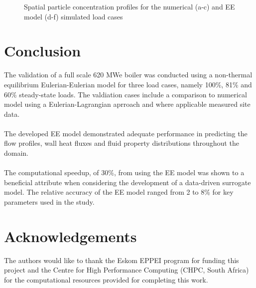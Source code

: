 \documentclass{webofc}
\begin{document}
\begin{figure}[h!]
\setlength{\belowcaptionskip}{0pt} 
\caption{Spatial particle concentration profiles for the numerical (a-c) and EE model (d-f) simulated load cases}
\label{fig_concentration}
\end{figure}

\section{Conclusion}
The validation of a full scale 620 MWe boiler was conducted using a non-thermal equilibrium Eulerian-Eulerian model for three load cases, namely 100\%, 81\% and 60\% steady-state loads. The valdiation cases include a comparison to numerical model using a Eulerian-Lagrangian aprroach and where applicable measured site data.\\
\\
The developed EE model demonstrated adequate performance in predicting the flow profiles, wall heat fluxes and fluid property distributions throughout the domain.\\
\\
The computational speedup, of 30\%, from using the EE model was shown to a beneficial attribute when considering the development of a data-driven surrogate model. The relative accuracy of the EE model ranged from 2 to 8\% for key parameters used in the study.

\section*{Acknowledgements}
The authors would like to thank the Eskom EPPEI program for funding this project and the Centre for High Performance Computing (CHPC, South Africa) for the computational resources provided for completing this work.

%
% 
%
%
\newpage
\end{document}
